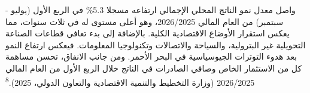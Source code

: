 واصل معدل نمو الناتج المحلي الإجمالي ارتفاعه مسجلا 5.3\% في الربع الأول (يوليو - سبتمبر) من العام المالي 2026/2025، وهو أعلى مستوى له في ثلاث سنوات، مما يعكس استقرار الأوضاع الاقتصادية الكلية. بالإضافة إلى بدء تعافي قطاعات الصناعة التحويلية غير البترولية، والسياحة والاتصالات وتكنولوجيا المعلومات. فيعكس ارتفاع النمو بعد هدوء التوترات الجيوسياسية في البحر الأحمر. ومن جانب الانفاق، تحسن مساهمة كل من الاستثمار الخاص وصافي الصادرات في الناتج خلال الربع الأول من العام المالي 2026/2025 (وزارة التخطيط والتنمية الاقتصادية والتعاون الدولي، 2025).\textsuperscript{8}
